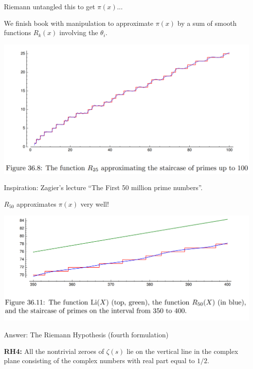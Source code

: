 \documentclass{beamer}
\begin{document}
\begin{frame}{Riemann untangled this to get $\pi(x)$...}

  We finish book with manipulation to approximate $\pi(x)$
  by a sum of smooth functions $R_k(x)$ involving the $\theta_i$.
  \vfill

  \includegraphics[height=.65\textheight]{pics/R25-approx}

  \vfill
  Inspiration: Zagier's lecture ``The First 50 million prime numbers''.
\end{frame}


\begin{frame}{$R_{50}$ approximates $\pi(x)$ very well!}

  \includegraphics[height=.55\textheight]{pics/Li-R50-pi}

\end{frame}



\begin{frame}{Answer: The Riemann Hypothesis (fourth formulation)}
\vfill
  \begin{block}{}
    \textbf{RH4:} All the nontrivial zeroes of $\zeta(s)$ lie on the vertical
    line in the complex plane consisting of the
    complex numbers with real part equal to $1/2$.
  \end{block}
  \vfill
\end{frame}
\end{document}
